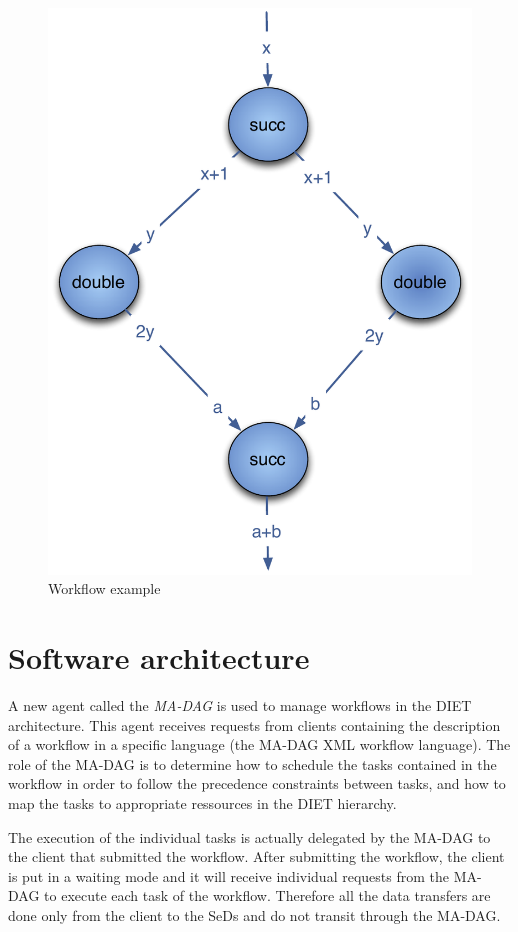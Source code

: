 \begin{figure}[htbp]
  \centering
  \includegraphics[keepaspectratio,width=0.4\linewidth]{fig/wf_example1}
  \caption{Workflow example}
  \label{fig:example1}
\end{figure}

\section{Software architecture}


A new agent called the \textit{MA-DAG} is used to manage workflows
in the DIET architecture. This agent receives requests from clients
containing the description of a workflow in a specific language
(the MA-DAG XML workflow language). The role of the MA-DAG is to
determine how to schedule the tasks contained in the workflow in
order to follow the precedence constraints between tasks, and how to
map the tasks to appropriate ressources in the DIET hierarchy.

The execution of the individual tasks is actually delegated by the
MA-DAG to the client that submitted the workflow. After submitting
the workflow, the client is put in a waiting mode and it will
receive individual requests from the MA-DAG to execute each task
of the workflow. Therefore all the data transfers are done only
from the client to the SeDs and do not transit through the MA-DAG.

